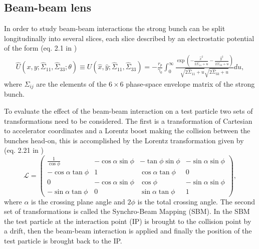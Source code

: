\documentclass[english]{article}
\begin{document}
\subsection{Beam-beam lens}
In order to study beam-beam interactions the strong bunch can be split
longitudinally into several slices, each slice described by an electrostatic
potential of the form (eq. 2.1 in \cite{beam_beam})
\begin{align}
    \hat{U}(x,y;\hat{\Sigma}_{11},\hat{\Sigma}_{33};\theta) \equiv
    U(\hat{x},\hat{y};\hat{\Sigma}_{11},\hat{\Sigma}_{33}) =
    -\frac{r_p}{\gamma_0} \int_0^\infty 
    \frac{\exp\left(-\frac{\hat{x}^2}{2\hat{\Sigma}_{11}+u}
    -\frac{\hat{y}^2}{2\hat{\Sigma}_{33}+u}\right)}{\sqrt{2\hat{\Sigma}_{11}+u}
    \sqrt{2\hat{\Sigma}_{33}+u}} du,
\end{align}
where $\Sigma_{ij}$ are the elements of the $6\times 6$ phase-space envelope
matrix of the strong bunch.

To evaluate the effect of the beam-beam interaction on a test particle two
sets of transformations need to be considered. The first is a transformation
of Cartesian to accelerator coordinates and a Lorentz boost making the
collision between the bunches head-on, this is accomplished by the Lorentz
transformation given by (eq. 2.21 in \cite{beam_beam})
\begin{equation}
    \mathcal{L} = \left(
        \begin{array}{cccc}
            \frac{1}{\cos\phi} & -\cos\alpha\sin\phi & 
            -\tan\phi\sin\phi & -\sin\alpha\sin\phi \\
            -\cos\alpha\tan\phi & 1 & \cos\alpha\tan\phi & 0 \\
            0 & -\cos\alpha\sin\phi & \cos\phi & -\sin\alpha\sin\phi \\
            -\sin\alpha\tan\phi & 0 & \sin\alpha\tan\phi & 1
        \end{array}
    \right),
\end{equation}
where $\alpha$ is the crossing plane angle and $2\phi$ is the total crossing
angle.  The second set of transformations is called the Synchro-Beam Mapping
(SBM). In the SBM the test particle at the interaction point (IP) is brought
to the collision point by a drift, then the beam-beam interaction is applied
and finally the position of the test particle is brought back to the IP.
\end{document}
